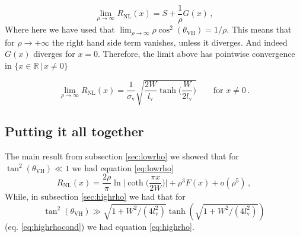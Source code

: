 \begin{equation}
    \lim_{\rho\to\infty} R_{\textrm{NL}}(x)=S + \frac 1\rho G(x)\,,
\end{equation}
Where here we have used that $\lim_{\rho\to \infty}\rho\cos^2(\theta_{\textrm{VH}})=1/\rho$.
This means that for $\rho\to +\infty$ the right hand side term vanishes, unless it diverges. And indeed $G(x)$ diverges for $x=0$. Therefore, the limit above has pointwise convergence in $\{x\in \mathbb R\,|\,x\neq 0\}$

\begin{equation}
    \lim_{\rho\to\infty} R_{\textrm{NL}}(x) = \frac 1{\sigma_{\textrm{v}}}\sqrt{\frac {2W}{l_{\textrm{v}}}\tanh\bigg(\frac W{2l_{\textrm{v}}} \bigg)}
    \quad\quad \textrm{for }x\neq 0\,.
    \label{eq:highrho}
\end{equation}














\subsection{Putting it all together}
The main result from subsection \ref{sec:lowrho} we showed that for $\tan^2(\theta_{\textrm{VH}})\ll 1$ we had equation \ref{eq:lowrho}
\[
    R_{\textrm{NL}}(x)=
    \frac{2\rho}\pi\ln\bigg |\coth \Big(\frac{\pi x}{2W}\Big)\bigg | +
    \rho^3F(x) +
    o(\rho^5)\,,
\]
While, in subsection \ref{sec:highrho} we had that for 
\[
\tan^2(\theta_{\textrm{VH}})\gg \sqrt{1+W^2/(4l_{\textrm{v}}^2)}\tanh\left(\sqrt{1+W^2/(4l_{\textrm{v}}^2)}\right)
\]
(eq. \ref{eq:highrhocond}) we had equation \ref{eq:highrho}.

